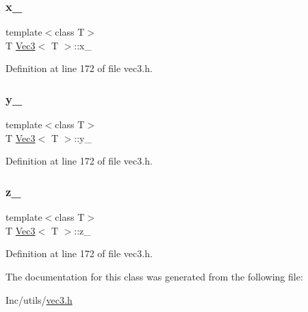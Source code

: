 \subsubsection{\texorpdfstring{x\_}{x\_}}
{\footnotesize\ttfamily template$<$class T$>$ \\
T \mbox{\hyperlink{class_vec3}{Vec3}}$<$ T $>$\+::x\+\_\+\hspace{0.3cm}{\ttfamily [private]}}



Definition at line 172 of file vec3.\+h.

\mbox{\label{class_vec3_a6371aee198bf180525adde8ab4653070}} 
\subsubsection{\texorpdfstring{y\_}{y\_}}
{\footnotesize\ttfamily template$<$class T$>$ \\
T \mbox{\hyperlink{class_vec3}{Vec3}}$<$ T $>$\+::y\+\_\+\hspace{0.3cm}{\ttfamily [private]}}



Definition at line 172 of file vec3.\+h.

\mbox{\label{class_vec3_afc4b262f25e6f72277a191e0d818e1e3}} 
\subsubsection{\texorpdfstring{z\_}{z\_}}
{\footnotesize\ttfamily template$<$class T$>$ \\
T \mbox{\hyperlink{class_vec3}{Vec3}}$<$ T $>$\+::z\+\_\+\hspace{0.3cm}{\ttfamily [private]}}



Definition at line 172 of file vec3.\+h.



The documentation for this class was generated from the following file\+:\begin{DoxyCompactItemize}
\item 
Inc/utils/\mbox{\hyperlink{vec3_8h}{vec3.\+h}}\end{DoxyCompactItemize}
